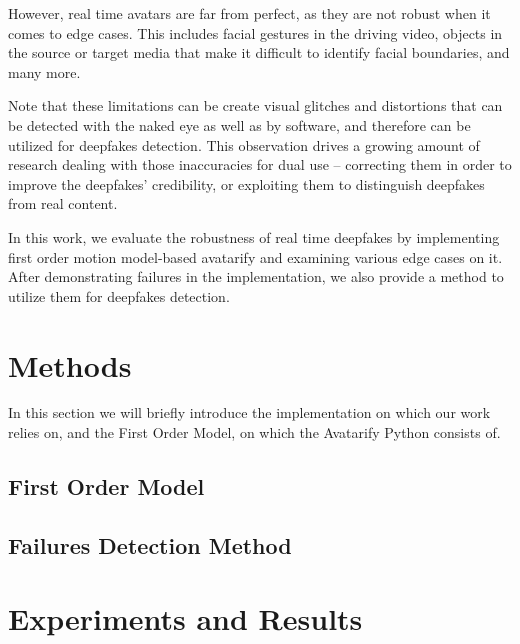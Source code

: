 \documentclass[english,12pt]{article}
\begin{document}
However, real time avatars are far from perfect, as they are not robust when it comes to edge cases.
This includes facial gestures in the driving video, objects in the source or target media that make it
difficult to identify facial boundaries, and many more.


Note that these limitations can be create visual glitches and distortions that can be detected with the
naked eye as well as by software, and therefore can be utilized for deepfakes detection. This observation
drives a growing amount of research dealing with those inaccuracies for dual use -- correcting them in
order to improve the deepfakes' credibility, or exploiting them to distinguish deepfakes from real content.

In this work, we evaluate the robustness of real time deepfakes by implementing first order motion
model-based avatarify and examining various edge cases on it. After demonstrating failures in the
implementation, we also provide a method to utilize them for deepfakes detection.



\section{Methods} \label{methods}

In this section we will briefly introduce the implementation on which our work relies on, and the
First Order Model, on which the Avatarify Python consists of.

\subsection{First Order Model}


\subsection{Failures Detection Method}



\section{Experiments and Results} \label{experiments and results}
\end{document}
